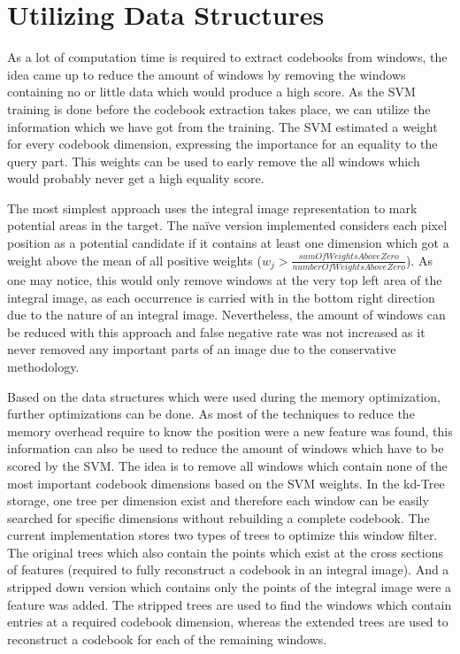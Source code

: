 \section{Utilizing Data Structures}
\label{sec:utilizing_data_structures}

As a lot of computation time is required to extract codebooks from windows, the idea came up to reduce the amount of windows by removing the windows containing no or little data which would produce a high score. As the \ac{SVM} training is done before the codebook extraction takes place, we can utilize the information which we have got from the training. The \ac{SVM} estimated a weight for every codebook dimension, expressing the importance for an equality to the query part. This weights can be used to early remove the all windows which would probably never get a high equality score.

The most simplest approach uses the integral image representation to mark potential areas in the target. The na\"{i}ve version implemented considers each pixel position as a potential candidate if it contains at least one dimension which got a weight above the mean of all positive weights ($w_j > \frac{sumOfWeightsAboveZero}{numberOfWeightsAboveZero}$). As one may notice, this would only remove windows at the very top left area of the integral image, as each occurrence is carried with in the bottom right direction due to the nature of an integral image. Nevertheless, the amount of windows can be reduced with this approach and false negative rate was not increased as it never removed any important parts of an image due to the conservative methodology.
\bigskip

Based on the data structures which were used during the memory optimization, further optimizations can be done. As most of the techniques to reduce the memory overhead require to know the position were a new feature was found, this information can also be used to reduce the amount of windows which have to be scored by the \ac{SVM}. The idea is to remove all windows which contain none of the most important codebook dimensions based on the \ac{SVM} weights. In the kd-Tree storage, one tree per dimension exist and therefore each window can be easily searched for specific dimensions without rebuilding a complete codebook. The current implementation stores two types of trees to optimize this window filter. The original trees which also contain the points which exist at the cross sections of features (required to fully reconstruct a codebook in an integral image). And a stripped down version which contains only the points of the integral image were a feature was added. The stripped trees are used to find the windows which contain entries at a required codebook dimension, whereas the extended trees are used to reconstruct a codebook for each of the remaining windows.
\bigskip

